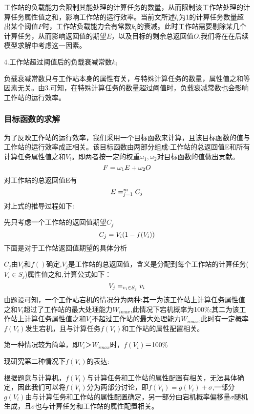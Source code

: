 \documentclass{MathorCupmodeling}
\begin{document}
工作站的负载能力会限制其能处理的计算任务的数量，从而限制该工作站处理的计算任务属性值之和，影响工作站的运行效率。当前文所述$l_i$为1的计算任务数量超出某个阈值$P$时，工作站负载能力会有常数$k_i$的衰减。此时工作站需要剔除某几个计算任务，从而影响返回值的期望$E$，以及目标的剩余总返回值$O$.我们将在在后续模型求解中考虑这一因素。

4.工作站超过阈值后的负载衰减常数$k_i$  

负载衰减常数只与工作站本身的属性有关，与特殊计算任务的数量，属性值之和等因素无关。由3.可知，在特殊计算任务的数量超过阈值时，负载衰减常数也会影响工作站的运行效率。


\subsubsection{目标函数的求解}

为了反映工作站的运行效率，我们采用一个目标函数来计算，且该目标函数的值与工作站的运行效率成正相关。该目标函数由两部分组成:工作站的总返回值E和所有计算任务属性值之和$V_i$。即两者按一定的权重$\omega_1,\omega_2$对目标函数的值做出贡献。
\begin{equation}
\Large F=\omega_1 E+\omega_2O\label{zz1}
\end{equation}
对工作站的总返回值E有
\begin{equation}
\Large E=\sum_{j=1}^{m} C_j\label{zz2}
\end{equation}
对上式的推导过程如下:

先只考虑一个工作站的返回值期望$C_j$
\begin{equation}
\large C_j =V_i(1-f(V_i))\label{zz3}
\end{equation}
下面是对于工作站返回值期望的具体分析

$C_j$由$V_i$和$f()$确定,$V_j$是工作站的总返回值，含义是分配到每个工作站的计算任务($V_i \in S_j$)属性值之和,计算公式如下：
\begin{equation}
\large V_j=\sum_{v_i \in S_j}v_i\label{zz4}
\end{equation}
由题设可知，一个工作站宕机的情况分为两种:其一为该工作站上计算任务属性值之和$V_i$超过了工作站的最大处理能力$W_{imax}$,此情况下宕机概率为100\%;其二为该工作站上计算任务属性值之和$V_i$不超过工作站的最大处理能力$W_{imax}$,此时有一定概率$f(V_i)$发生宕机，且与计算任务$f(V_i)$和工作站的属性配置相关。

第一种情况较为简单，即$V_i$＞$W_{imax}$时，$f(V_i)$＝100\%

现研究第二种情况下$f(V_i)$的表达:

根据题意与计算机，$f(V_i)$与计算任务和工作站的属性配置有相关，无法具体确定，因此我们可以将$f(V_i)$分为两部分讨论，即$f(V_i)= g(V_i)+\sigma$,一部分$g(V_i)$由与计算任务和工作站的属性配置确定，另一部分由宕机概率偏移量$\sigma$随机生成，且$\sigma$也与计算任务和工作站的属性配置相关。
\end{document}
